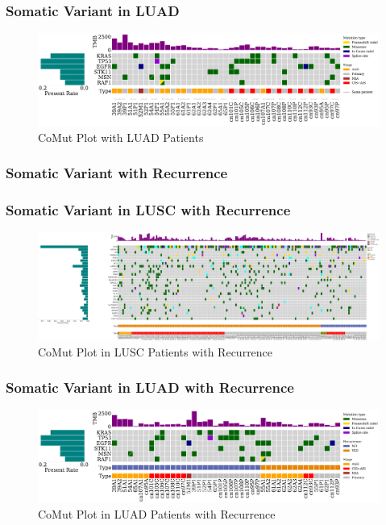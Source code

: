 \documentclass{beamer}
\begin{document}
    \begin{frame}
        \frametitle{Somatic Variant in LUAD}

        \begin{figure}
            \includegraphics[width=\linewidth]{figures/Mutect2/BWA-ADC.pdf}
            \caption{CoMut Plot with LUAD Patients}
        \end{figure}
    \end{frame}

    \subsubsection{Somatic Variant with Recurrence}
    \begin{frame}
        \frametitle{Somatic Variant in LUSC with Recurrence}

        \begin{figure}
            \includegraphics[width=\linewidth]{figures/Mutect2/BWA-SQC.Recur.pdf}
            \caption{CoMut Plot in LUSC Patients with Recurrence}
        \end{figure}
    \end{frame}

    \begin{frame}
        \frametitle{Somatic Variant in LUAD with Recurrence}

        \begin{figure}
            \includegraphics[width=\linewidth]{figures/Mutect2/BWA-ADC.Recur.pdf}
            \caption{CoMut Plot in LUAD Patients with Recurrence}
        \end{figure}
    \end{frame}
\end{document}
